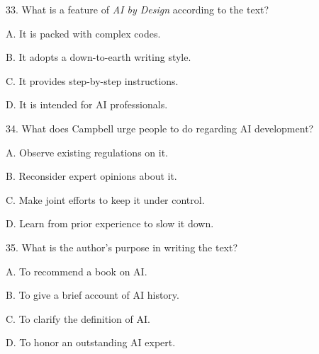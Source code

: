 \documentclass[a4paper]{ctexart}
\begin{document}
33. What is a feature of \textit{AI by Design} according to the text? 

A. It is packed with complex codes.            

B. It adopts a down-to-earth writing style.

C. It provides step-by-step instructions.     
    
D. It is intended for AI professionals. 

34. What does Campbell urge people to do regarding AI development? 

A. Observe existing regulations on it.

B. Reconsider expert opinions about it.  

C. Make joint efforts to keep it under control. 

D. Learn from prior experience to slow it down. 

35. What is the author's purpose in writing the text? 

A. To recommend a book on AI.         

B. To give a brief account of AI history. 

C. To clarify the definition of AI.        

D. To honor an outstanding AI expert.


\newpage
\end{document}
